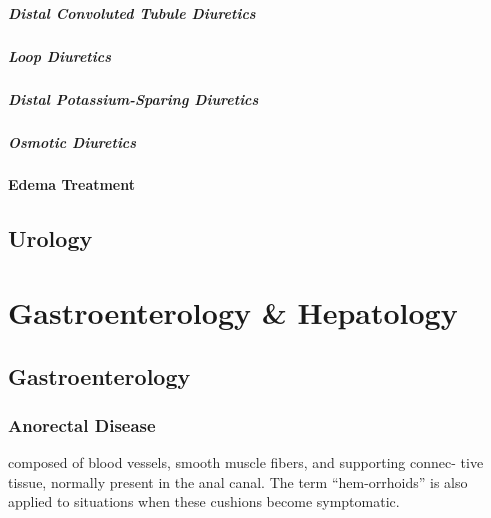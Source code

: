 \documentclass[
  letterpaper,
  DIV=11,
  numbers=noendperiod]{scrreprt}
\let\oldparagraph\paragraph
\renewcommand{\paragraph}[1]{\oldparagraph{#1}\mbox{}}
\begin{document}
\paragraph{Distal Convoluted Tubule
Diuretics}\label{distal-convoluted-tubule-diuretics}

\paragraph{Loop Diuretics}\label{loop-diuretics}

\paragraph{Distal Potassium-Sparing
Diuretics}\label{distal-potassium-sparing-diuretics}

\paragraph{Osmotic Diuretics}\label{osmotic-diuretics}

\subsubsection{Edema Treatment}\label{edema-treatment}

\section{Urology}\label{urology}

\chapter{Gastroenterology \&
Hepatology}\label{gastroenterology-hepatology}

\section{Gastroenterology}\label{gastroenterology}

\subsection{Anorectal Disease}\label{anorectal-disease}

composed of blood vessels, smooth muscle ﬁbers, and supporting connec-
tive tissue, normally present in the anal canal. The term
``hem-orrhoids'' is also applied to situations when these cushions
become symptomatic.
\end{document}
